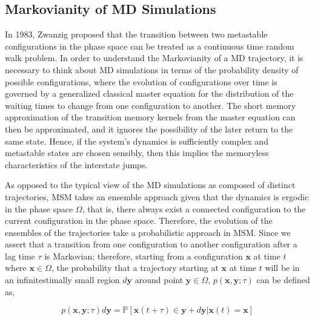\begin{spacing}{2.0}
    \section{Markovianity of MD Simulations}\label{sec:markovian}

    In 1983, Zwanzig proposed that the transition between two metastable configurations in the phase space can be treated as a continuous time 
    random walk problem. \cite{P-JStatPhys-1983-v30-Zwanzig} In order to understand the Markovianity of a MD trajectory, it is necessary to think 
    about MD simulations in terms of the probability density of possible configurations, where the evolution of configurations over time is governed 
    by a generalized classical master equation for the distribution of the waiting times to change from one configuration to another. The short memory 
    approximation of the transition memory kernels from the master equation can then be approximated, and it ignores the possibility of the later 
    return to the same state. Hence, if the system's dynamics is sufficiently complex and metastable states are chosen sensibly, then this implies 
    the memoryless characteristics of the interstate jumps. \cite{P-JStatPhys-1983-v30-Zwanzig}

    As opposed to the typical view of the MD simulations as composed of distinct trajectories, MSM takes an ensemble approach given that the dynamics 
    is ergodic in the phase space $\Omega$, that is, there always exist a connected configuration to the current configuration in the phase space. 
    Therefore, the evolution of the ensembles of the trajectories take a probabilistic approach in MSM. Since we assert that a transition from one 
    configuration to another configuration after a lag time $\tau$ is Markovian; therefore, starting from a configuration $\mathbf{x}$ at time $t$
    where $\mathbf{x} \in \Omega$, the probability that a trajectory starting at $\mathbf{x}$ at time $t$ will be in an infinitestimally small
    region $d\mathbf{y}$ around point $\mathbf{y} \in \Omega$, $p(\mathbf{x}, \mathbf{y}; \tau)$ can be defined as, 
    \cite{P-JChemPhys-2011-v134-Prinz, P-PhysChemChemPhys-2011-v13-Prinz}

    \begin{equation}
        p(\mathbf{x}, \mathbf{y}; \tau)d\mathbf{y} = \mathbb{P}[\mathbf{x}(t+\tau)\in\mathbf{y}+d\mathbf{y}|\mathbf{x}(t)=\mathbf{x}]
        \label{eq:msm-prob-def}
    \end{equation}


\end{spacing}

